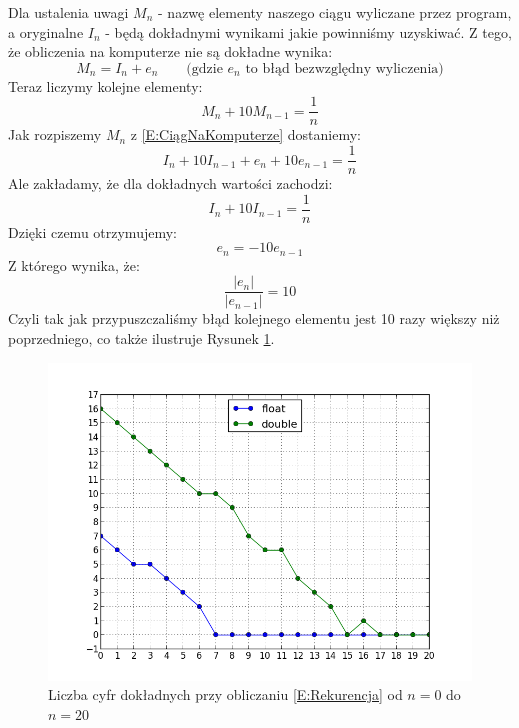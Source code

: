 \documentclass[11pt,leqno]{article}
\begin{document}
Dla ustalenia uwagi $M_{n}$ - nazwę elementy naszego ciągu wyliczane przez program, a oryginalne $I_{n}$ -
będą dokładnymi wynikami jakie powinniśmy uzyskiwać. Z tego, że obliczenia na komputerze nie są dokładne wynika:
\begin{equation}\label{E:CiągNaKomputerze}
    M_{n} = I_{n} + e_{n}\qquad\mbox{(gdzie $e_{n}$ to błąd bezwzględny wyliczenia)}
\end{equation}
Teraz liczymy kolejne elementy:
$$
    M_{n} + 10M_{n-1} = \frac{1}{n}
$$
Jak rozpiszemy $M_{n}$ z \eqref{E:CiągNaKomputerze} dostaniemy:
$$
    I_{n} + 10I_{n-1} + e_{n} + 10e_{n-1} = \frac{1}{n}
$$
Ale zakładamy, że dla dokładnych wartości zachodzi:
$$
    I_{n} + 10I_{n-1} = \frac{1}{n}
$$
Dzięki czemu otrzymujemy:
$$
    e_{n} = -10e_{n-1}
$$
Z którego wynika, że:
$$
    \frac{|e_{n}|}{|e_{n-1}|} = 10
$$
Czyli tak jak przypuszczaliśmy błąd kolejnego elementu jest 10 razy większy niż poprzedniego,
co także ilustruje Rysunek \ref{G:WykresBleduDoPrzodu}.
\begin{center}
    \begin{figure}[!h]
        \vspace{-2em}
        \begin{center}
        \includegraphics[scale=0.5,angle=0]{wykresbledudoprzodu.png}
        \vspace{-2,5em}
        \caption{Liczba cyfr dokładnych przy obliczaniu \eqref{E:Rekurencja} od $n=0$ do $n=20$}\label{G:WykresBleduDoPrzodu}
    \end{center}
    \vspace{-2em}
    \end{figure}
\end{center}
\end{document}
